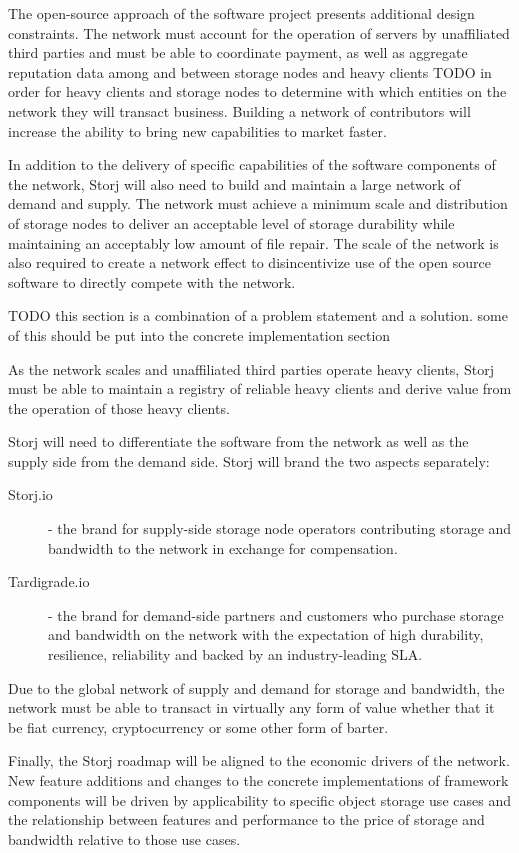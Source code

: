 \documentclass[11pt,fleqn,openany]{book}
\newcommand{\todo}[1]{{\color{red} TODO #1 }}
\begin{document}
The open-source approach of the software project presents additional design
constraints.
The network must account for the operation of servers by unaffiliated third
parties and must be able to coordinate payment, as well as aggregate reputation
data among and between storage nodes and heavy clients \todo{} in order for
heavy clients and storage nodes to determine with which entities on the
network they will transact business.
Building a network of contributors will increase the ability to bring new
capabilities to market faster.

In addition to the delivery of specific capabilities of the software components
of the network, Storj will also need to build and maintain a large network of
demand and supply.
The network must achieve a minimum scale and distribution of storage nodes to
deliver an acceptable level of storage durability while maintaining an
acceptably low amount of file repair.
The scale of the network is also required to create a network effect to
disincentivize use of the open source software to directly compete with the
network.

\todo{this section is a combination of a problem statement and a solution.
some of this should be put into the concrete implementation section}

As the network scales and unaffiliated third parties operate heavy clients,
Storj must be able to maintain a registry of reliable heavy clients and derive
value from the operation of those heavy clients.

Storj will need to differentiate the software from the network as well as the
supply side from the demand side. Storj will brand the two aspects separately:
\begin{description}
\item[Storj.io] - the brand for supply-side storage node operators contributing
storage and bandwidth to the network in exchange for compensation.
\item[Tardigrade.io] - the brand for demand-side partners and customers who
purchase storage and bandwidth on the network with the expectation of high
durability, resilience, reliability and backed by an industry-leading SLA.
\end{description}

Due to the global network of supply and demand for storage and bandwidth, the
network must be able to transact in virtually any form of value whether that it
be fiat currency, cryptocurrency or some other form of barter.

Finally, the Storj roadmap will be aligned to the economic drivers of the
network.
New feature additions and changes to the concrete implementations of framework
components will be driven by applicability to specific object storage use cases
and the relationship between features and performance to the price of storage
and bandwidth relative to those use cases.
\end{document}
